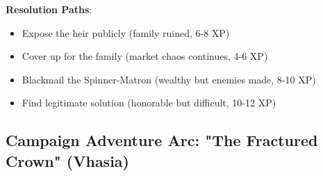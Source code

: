 \documentclass[11pt]{article}
\begin{document}
\begin{mdframed}[backgroundcolor=modulebg]
\textbf{Resolution Paths}:
\begin{itemize}[leftmargin=*]
\item Expose the heir publicly (family ruined, 6-8 XP)
\item Cover up for the family (market chaos continues, 4-6 XP)
\item Blackmail the Spinner-Matron (wealthy but enemies made, 8-10 XP)
\item Find legitimate solution (honorable but difficult, 10-12 XP)
\end{itemize}
\end{mdframed}

\subsection*{Campaign Adventure Arc: "The Fractured Crown" (Vhasia)}
\end{document}
